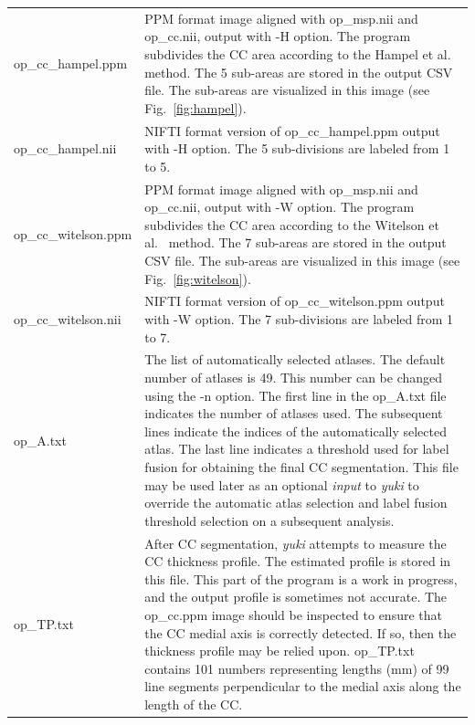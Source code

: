 \documentclass[11pt]{article}
\begin{document}
\begin{longtable}{p{}p{}}
op\_cc\_hampel.ppm & PPM format image aligned with op\_msp.nii and op\_cc.nii,
output with -H option. The program subdivides the CC area 
according to the Hampel et al.\ \citep{Hampel1998-fz} method. 
The 5 sub-areas are stored
in the output CSV file. The sub-areas are visualized in this image 
(see Fig.\ \ref{fig:hampel}). \\ 

op\_cc\_hampel.nii & NIFTI format version of op\_cc\_hampel.ppm output with -H option. 
The 5 sub-divisions are labeled from 1 to 5. \\

op\_cc\_witelson.ppm & PPM format image aligned with op\_msp.nii and op\_cc.nii,
output with -W option. The program subdivides the CC area 
according to the Witelson et al.\ \citep{Narayan2016-es} method. 
The 7 sub-areas are stored
in the output CSV file. The sub-areas are visualized in this image 
(see Fig.\ \ref{fig:witelson}). \\ 

op\_cc\_witelson.nii & NIFTI format version of op\_cc\_witelson.ppm output with -W option. 
The 7 sub-divisions are labeled from 1 to 7. \\

op\_A.txt &  The list of automatically selected atlases.  
The default number of atlases is 49.  This number
can be changed using the -n option.  The first line in the op\_A.txt file indicates the
number of atlases used.  The subsequent lines indicate the indices of the automatically selected
atlas.  The last line indicates a threshold used for label fusion for obtaining the final 
CC segmentation.  This file may be used later as an optional {\em input} to {\it yuki} 
to override the automatic atlas selection and label fusion threshold selection on a subsequent
analysis.
\\

op\_TP.txt & After CC segmentation, {\it yuki} attempts to measure the CC thickness profile.
The estimated profile is stored in this file.  This part of the program is a work in progress,
and the output profile is sometimes not accurate.  The op\_cc.ppm image should be inspected
to ensure that the CC medial axis is correctly detected.  If so, then the thickness profile
may be relied upon.  op\_TP.txt contains 101 numbers representing lengths (mm) of 99 line
segments perpendicular to the medial axis along the length of the CC. \\

\end{longtable}
\end{document}
